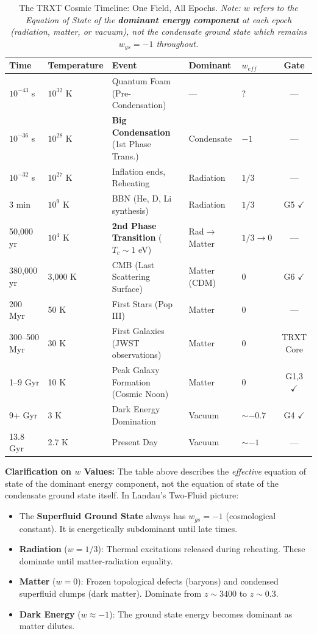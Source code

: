 \documentclass[a4paper,12pt]{article}
\begin{document}
\begin{table}[H]
\centering
\caption{The TRXT Cosmic Timeline: One Field, All Epochs. \textit{Note: $w$ refers to the Equation of State of the \textbf{dominant energy component} at each epoch (radiation, matter, or vacuum), not the condensate ground state which remains $w_{gs} = -1$ throughout.}}
\label{tab:timeline}
\begin{tabular}{@{}lllllc@{}}
\toprule
\textbf{Time} & \textbf{Temperature} & \textbf{Event} & \textbf{Dominant} & \textbf{$w_{eff}$} & \textbf{Gate} \\
\midrule
$10^{-43}$ s & $10^{32}$ K & Quantum Foam (Pre-Condensation) & --- & ? & --- \\
$10^{-36}$ s & $10^{28}$ K & \textbf{Big Condensation} (1st Phase Trans.) & Condensate & $-1$ & --- \\
$10^{-32}$ s & $10^{27}$ K & Inflation ends, Reheating & Radiation & $1/3$ & --- \\
3 min & $10^{9}$ K & BBN (He, D, Li synthesis) & Radiation & $1/3$ & G5 $\checkmark$ \\
50,000 yr & $10^{4}$ K & \textbf{2nd Phase Transition} ($T_c \sim 1$ eV) & Rad$\to$Matter & $1/3 \to 0$ & --- \\
380,000 yr & 3,000 K & CMB (Last Scattering Surface) & Matter (CDM) & 0 & G6 $\checkmark$ \\
200 Myr & 50 K & First Stars (Pop III) & Matter & 0 & --- \\
300--500 Myr & 30 K & First Galaxies (JWST observations) & Matter & 0 & TRXT Core \\
1--9 Gyr & 10 K & Peak Galaxy Formation (Cosmic Noon) & Matter & 0 & G1,3 $\checkmark$ \\
9+ Gyr & 3 K & Dark Energy Domination & Vacuum & $\sim -0.7$ & G4 $\checkmark$ \\
13.8 Gyr & 2.7 K & Present Day & Vacuum & $\sim -1$ & --- \\
\bottomrule
\end{tabular}
\end{table}

\textbf{Clarification on $w$ Values:}
The table above describes the \textit{effective} equation of state of the dominant energy component, not the equation of state of the condensate ground state itself. In Landau's Two-Fluid picture:
\begin{itemize}
    \item The \textbf{Superfluid Ground State} always has $w_{gs} = -1$ (cosmological constant). It is energetically subdominant until late times.
    \item \textbf{Radiation} ($w = 1/3$): Thermal excitations released during reheating. These dominate until matter-radiation equality.
    \item \textbf{Matter} ($w = 0$): Frozen topological defects (baryons) and condensed superfluid clumps (dark matter). Dominate from $z \sim 3400$ to $z \sim 0.3$.
    \item \textbf{Dark Energy} ($w \approx -1$): The ground state energy becomes dominant as matter dilutes.
\end{itemize}
\end{document}

